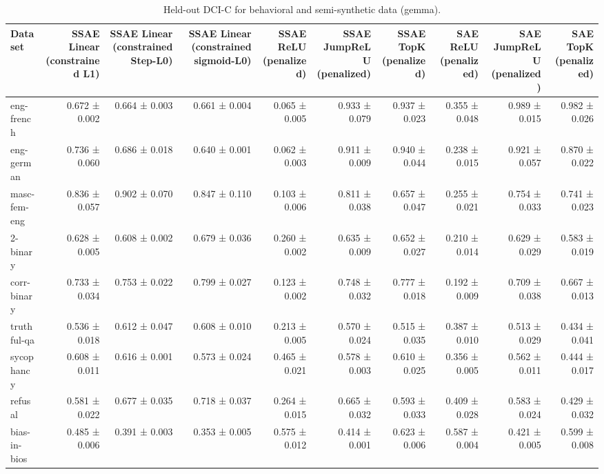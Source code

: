 \begin{table}[t]
\centering
\caption{Held-out DCI-C for behavioral and semi-synthetic data (gemma).}
\label{tab:all-datasets-gemma-dci-c}
\begin{tabular}{lrrrrrrrrr}
\toprule
Dataset & SSAE Linear (constrained L1) & SSAE Linear (constrained Step-L0) & SSAE Linear (constrained sigmoid-L0) & SSAE ReLU (penalized) & SSAE JumpReLU (penalized) & SSAE TopK (penalized) & SAE ReLU (penalized) & SAE JumpReLU (penalized) & SAE TopK (penalized) \\
\midrule
eng-french & 0.672 ± 0.002 & 0.664 ± 0.003 & 0.661 ± 0.004 & 0.065 ± 0.005 & 0.933 ± 0.079 & 0.937 ± 0.023 & 0.355 ± 0.048 & 0.989 ± 0.015 & 0.982 ± 0.026 \\
eng-german & 0.736 ± 0.060 & 0.686 ± 0.018 & 0.640 ± 0.001 & 0.062 ± 0.003 & 0.911 ± 0.009 & 0.940 ± 0.044 & 0.238 ± 0.015 & 0.921 ± 0.057 & 0.870 ± 0.022 \\
masc-fem-eng & 0.836 ± 0.057 & 0.902 ± 0.070 & 0.847 ± 0.110 & 0.103 ± 0.006 & 0.811 ± 0.038 & 0.657 ± 0.047 & 0.255 ± 0.021 & 0.754 ± 0.033 & 0.741 ± 0.023 \\
2-binary & 0.628 ± 0.005 & 0.608 ± 0.002 & 0.679 ± 0.036 & 0.260 ± 0.002 & 0.635 ± 0.009 & 0.652 ± 0.027 & 0.210 ± 0.014 & 0.629 ± 0.029 & 0.583 ± 0.019 \\
corr-binary & 0.733 ± 0.034 & 0.753 ± 0.022 & 0.799 ± 0.027 & 0.123 ± 0.002 & 0.748 ± 0.032 & 0.777 ± 0.018 & 0.192 ± 0.009 & 0.709 ± 0.038 & 0.667 ± 0.013 \\
truthful-qa & 0.536 ± 0.018 & 0.612 ± 0.047 & 0.608 ± 0.010 & 0.213 ± 0.005 & 0.570 ± 0.024 & 0.515 ± 0.035 & 0.387 ± 0.010 & 0.513 ± 0.029 & 0.434 ± 0.041 \\
sycophancy & 0.608 ± 0.011 & 0.616 ± 0.001 & 0.573 ± 0.024 & 0.465 ± 0.021 & 0.578 ± 0.003 & 0.610 ± 0.025 & 0.356 ± 0.005 & 0.562 ± 0.011 & 0.444 ± 0.017 \\
refusal & 0.581 ± 0.022 & 0.677 ± 0.035 & 0.718 ± 0.037 & 0.264 ± 0.015 & 0.665 ± 0.032 & 0.593 ± 0.033 & 0.409 ± 0.028 & 0.583 ± 0.024 & 0.429 ± 0.032 \\
bias-in-bios & 0.485 ± 0.006 & 0.391 ± 0.003 & 0.353 ± 0.005 & 0.575 ± 0.012 & 0.414 ± 0.001 & 0.623 ± 0.006 & 0.587 ± 0.004 & 0.421 ± 0.005 & 0.599 ± 0.008 \\
\bottomrule
\end{tabular}
\end{table}
